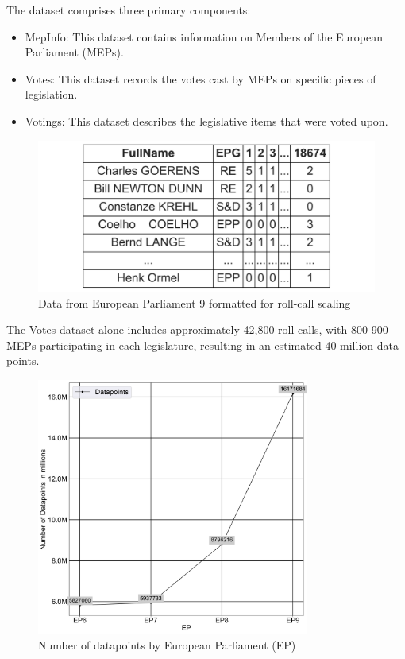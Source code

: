 \documentclass{report}
\begin{document}
            The dataset comprises three primary components:


            \begin{itemize}
                \item MepInfo: This dataset contains information on Members of the European Parliament (MEPs).
                \item Votes: This dataset records the votes cast by MEPs on specific pieces of legislation.
                \item Votings: This dataset describes the legislative items that were voted upon.
            \end{itemize}
            \begin{figure}[htb]
                \centering
                \includegraphics[width=1\textwidth]{Graphs/short_table9.png}
                \caption{Data from European Parliament 9 formatted for roll-call scaling}
                \label{fig:Structure table}
            \end{figure}

            The Votes dataset alone includes approximately 42,800 roll-calls, with 800-900 MEPs participating in each
            legislature, resulting in an estimated 40 million data points.
            \begin{figure}[htb]
                \centering
                \includegraphics[width=0.8\textwidth]{Graphs/Datapoints.png}
                \caption{Number of datapoints by European Parliament (EP)}
                \label{fig:Datapoint graph}
            \end{figure}
\end{document}
